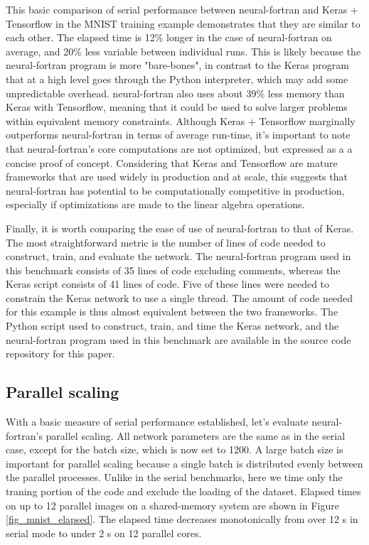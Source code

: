 \documentclass[sigplan, review=false, screen=true, balance=true]{acmart}
\begin{document}
This basic comparison of serial performance between neural-fortran and
Keras + Tensorflow in the MNIST training example demonstrates that they are
similar to each other. The elapsed time is 12\% longer in the case
of neural-fortran on average, and 20\% less variable between individual runs.
This is likely because the neural-fortran program is more "bare-bones", in
contrast to the Keras program that at a high level goes through the Python
interpreter, which may add some unpredictable overhead. neural-fortran also
uses about 39\% less memory than Keras with Tensorflow, meaning that it could
be used to solve larger problems within equivalent memory constraints. Although
Keras + Tensorflow marginally outperforms neural-fortran in terms of average
run-time, it's important to note that neural-fortran's core computations are
not optimized, but expressed as a a concise proof of concept.
Considering that Keras and Tensorflow are mature frameworks that are used
widely in production and at scale, this suggests that neural-fortran has
potential to be computationally competitive in production, especially if
optimizations are made to the linear algebra operations.

Finally, it is worth comparing the ease of use of neural-fortran to that of Keras. 
The most straightforward metric is the number of lines of code needed to
construct, train, and evaluate the network. The neural-fortran program used
in this benchmark consists of 35 lines of code excluding comments,
whereas the Keras script consists of 41 lines of code. Five of these lines
were needed to constrain the Keras network to use a single thread.
The amount of code needed for this example is thus almost equivalent
between the two frameworks.
The Python script used to construct, train, and time the Keras network,
and the neural-fortran program used in this benchmark are available in the
source code repository for this paper.

\subsection{Parallel scaling}

With a basic measure of serial performance established, let's evaluate
neural-fortran's parallel scaling. All network parameters are the same as in
the serial case, except for the batch size, which is now set to 1200.
A large batch size is important for parallel scaling because a single batch is
distributed evenly between the parallel processes.
Unlike in the serial benchmarks, here we time only the traning portion
of the code and exclude the loading of the dataset. Elapsed times on up to
12 parallel images on a shared-memory system are shown in Figure
\ref{fig_mnist_elapsed}. The elapsed time decreases monotonically from over
12 s in serial mode to under 2 s on 12 parallel cores.
\end{document}
